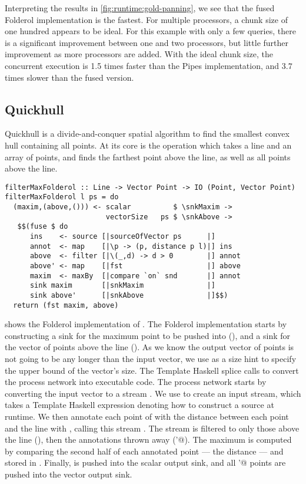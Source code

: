 Interpreting the results in \cref{fig:runtime:gold-panning}, we see that the fused Folderol implementation is the fastest.
For multiple processors, a chunk size of one hundred appears to be ideal.
For this example with only a few queries, there is a significant improvement between one and two processors, but little further improvement as more processors are added.
With the ideal chunk size, the concurrent execution is 1.5 times faster than the Pipes implementation, and $3.7$ times slower than the fused version.


\subsection{Quickhull}

Quickhull is a divide-and-conquer spatial algorithm to find the smallest convex hull containing all points.
At its core is the \Hs@filterMax@ operation which takes a line and an array of points, and finds the farthest point above the line, as well as all points above the line.

\begin{lstlisting}[float,label=l:bench:filterMaxFolderol,caption=Folderol implementation of \Hs/filterMax/]
filterMaxFolderol :: Line -> Vector Point -> IO (Point, Vector Point)
filterMaxFolderol l ps = do
  (maxim,(above,())) <- scalar          $ \snkMaxim ->
                        vectorSize   ps $ \snkAbove ->
   $$(fuse $ do
      ins    <- source [|sourceOfVector ps      |]
      annot  <- map    [|\p -> (p, distance p l)|] ins
      above  <- filter [|\(_,d) -> d > 0        |] annot
      above' <- map    [|fst                    |] above
      maxim  <- maxBy  [|compare `on` snd       |] annot
      sink maxim       [|snkMaxim               |]
      sink above'      [|snkAbove               |]$$)
  return (fst maxim, above)
\end{lstlisting}

 shows the Folderol implementation of \Hs@filterMax@.
The Folderol implementation starts by constructing a sink for the maximum point to be pushed into (\Hs@snkMaxim@), and a sink for the vector of points above the line (\Hs@snkAbove@).
As we know the output vector of points is not going to be any longer than the input vector, we use \Hs@vectorSize@ as a size hint to specify the upper bound of the vector's size.
The Template Haskell splice calls \Hs@fuse@ to convert the process network into executable code.
The process network starts by converting the input vector \Hs@pts@ to a stream \Hs@ins@.
We use \Hs@source@ to create an input stream, which takes a Template Haskell expression denoting how to construct a source at runtime.
We then annotate each point of \Hs@ins@ with the distance between each point and the line with \Hs@map@, calling this stream \Hs@annot@.
The \Hs@annot@ stream is filtered to only those above the line (\Hs@above@), then the annotations thrown away (\Hs@above'@).
The maximum is computed by comparing the second half of each annotated point --- the distance --- and stored in \Hs@maxim@.
Finally, \Hs@maxim@ is pushed into the scalar output sink, and all \Hs@above'@ points are pushed into the vector output sink.


